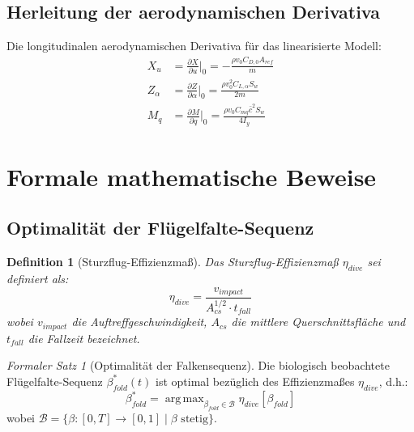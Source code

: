 ﻿\documentclass[12pt,a4paper]{article}
\newtheorem{definition}{Definition}[section]
\theoremstyle{remark}
\newtheorem{formalersatz}{Formaler Satz}[section]
\DeclareMathOperator*{\argmax}{arg\,max}
\begin{document}
	\subsection{Herleitung der aerodynamischen Derivativa}
	
	Die longitudinalen aerodynamischen Derivativa für das linearisierte Modell:
	\begin{align}
		X_u &= \frac{\partial X}{\partial u}\bigg|_0 = -\frac{\rho v_0 C_{D,0} A_{ref}}{m} \\
		Z_\alpha &= \frac{\partial Z}{\partial \alpha}\bigg|_0 = \frac{\rho v_0^2 C_{L,\alpha} S_w}{2m} \\
		M_q &= \frac{\partial M}{\partial q}\bigg|_0 = \frac{\rho v_0 C_{mq} \bar{c}^2 S_w}{4 I_y}
	\end{align}
	
	\section{Formale mathematische Beweise}
	\label{sec:formal}
	
	\subsection{Optimalität der Flügelfalte-Sequenz}
	
	\begin{definition}[Sturzflug-Effizienzmaß]
		\label{def:effizienz}
		Das Sturzflug-Effizienzmaß $\eta_{dive}$ sei definiert als:
		\begin{equation}
			\eta_{dive} = \frac{v_{impact}}{A_{cs}^{1/2} \cdot t_{fall}}
		\end{equation}
		wobei $v_{impact}$ die Auftreffgeschwindigkeit, $A_{cs}$ die mittlere Querschnittsfläche und $t_{fall}$ die Fallzeit bezeichnet.
	\end{definition}
	
	\begin{formalersatz}[Optimalität der Falkensequenz]
		Die biologisch beobachtete Flügelfalte-Sequenz $\beta^*_{fold}(t)$ ist optimal bezüglich des Effizienzmaßes $\eta_{dive}$, d.h.:
		\begin{equation}
			\beta^*_{fold} = \argmax_{\beta_{fold} \in \mathcal{B}} \eta_{dive}[\beta_{fold}]
		\end{equation}
		wobei $\mathcal{B} = \{\beta: [0,T] \to [0,1] \mid \beta \text{ stetig}\}$.
	\end{formalersatz}
	
\end{document}
